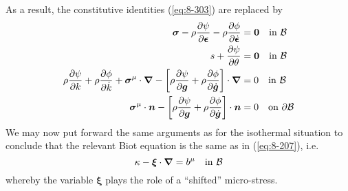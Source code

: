 As a result, the constitutive identities (\ref{eq:8-303}) are replaced by
\begin{subequations}\label{eq:8-203}
    \begin{align}
    \bm{\sigma} - \rho \frac{\partial \psi}{\partial \bm{\epsilon}} -  
    \rho \frac{\partial \phi}{\partial \dot{\bm{\epsilon}}} &= \bm{0} \quad
    \mbox{in } \mathcal{B}
\label{eq:8-203a}\\
    s + \frac{\partial \psi}{\partial \theta} &= \bm{0} \quad
    \mbox{in } \mathcal{B}
\label{eq:8-203b}\\
    \rho\frac{\partial \psi}{\partial k} + \rho\frac{\partial \phi}{\partial \dot{k}} +
    \bm{\sigma}^{\mathrm{\mu}}\cdot {\bm\nabla} - \left[\rho\frac{\partial \psi}{\partial \bm {g}} + 
    \rho\frac{\partial \phi}{\partial \dot{\bm {g}}}\right] \cdot {\bm\nabla} &= 0 \quad
    \mbox{in }  \mathcal{B}
\label{eq:8-203c} \\
    \bm{\sigma}^{\mathrm{\mu}}\cdot \bm{n} - \left[\rho\frac{\partial \psi}{\partial \bm {g}} + 
  \rho\frac{\partial \phi}{\partial \dot{\bm {g}}}\right] \cdot \bm{n} &= 0 \quad
    \mbox{on }  \partial\mathcal{B}
\label{eq:8-203d}
    \end{align}
\end{subequations}
We may now put forward the same arguments as for the isothermal situation to 
conclude that the relevant Biot equation is the same as in (\ref{eq:8-207}), i.e.
\begin{equation}
    \kappa - \bm{\xi}\cdot{\bm\nabla} = b^{\mathrm{\mu}} \quad
    \mbox{in }  \mathcal{B}
\label{eq:8-207a}
\end{equation}
whereby the variable $\bm{\xi}$ plays the role of a ``shifted'' micro-stress.

